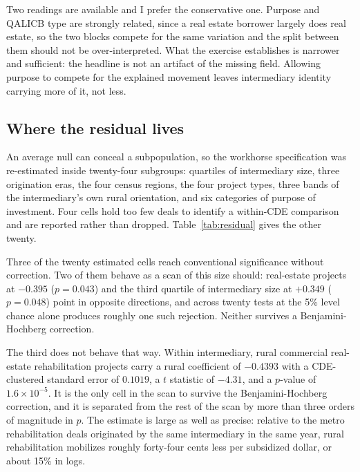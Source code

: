 Two readings are available and I prefer the conservative one. Purpose and
QALICB type are strongly related, since a real estate borrower largely does
real estate, so the two blocks compete for the same variation and the split
between them should not be over-interpreted. What the exercise establishes
is narrower and sufficient: the headline is not an artifact of the missing
field. Allowing purpose to compete for the explained movement leaves
intermediary identity carrying more of it, not less.

\begin{table}[!htbp]
\centering
\caption{Purpose of investment, a channel recorded in the public release
and not used elsewhere in this paper. Panel A gives composition and
leverage by purpose. Panel B inserts purpose into the ladder; columns
through the sixth row report HC1 standard errors and the last two cluster
at the CDE level. Panel C reports the order-invariant decomposition with
purpose as a fourth block, whose contributions sum to the total by identity
(residual below $10^{-15}$).}
\label{tab:purpose}

\end{table}

\subsection{Where the residual lives}\label{sec:residual}

An average null can conceal a subpopulation, so the workhorse specification
was re-estimated inside twenty-four subgroups: quartiles of intermediary
size, three origination eras, the four census regions, the four project
types, three bands of the intermediary's own rural orientation, and six
categories of purpose of investment. Four cells hold too few deals to
identify a within-CDE comparison and are reported rather than dropped.
Table~\ref{tab:residual} gives the other twenty.

Three of the twenty estimated cells reach conventional significance without
correction. Two of them behave as a scan of this size should: real-estate
projects at $-0.395$ ($p = 0.043$) and the third quartile of intermediary
size at $+0.349$ ($p = 0.048$) point in opposite directions, and across
twenty tests at the 5\% level chance alone produces roughly one such
rejection. Neither survives a Benjamini-Hochberg correction.

The third does not behave that way. Within intermediary, rural commercial
real-estate rehabilitation projects carry a rural coefficient of $-0.4393$
with a CDE-clustered standard error of $0.1019$, a $t$ statistic of
$-4.31$, and a $p$-value of $1.6 \times 10^{-5}$. It is the only cell in
the scan to survive the Benjamini-Hochberg correction, and it is separated
from the rest of the scan by more than three orders of magnitude in
$p$. The estimate is large as well as precise: relative to the metro
rehabilitation deals originated by the same intermediary in the same year,
rural rehabilitation mobilizes roughly forty-four cents less per subsidized
dollar, or about 15\% in logs.

